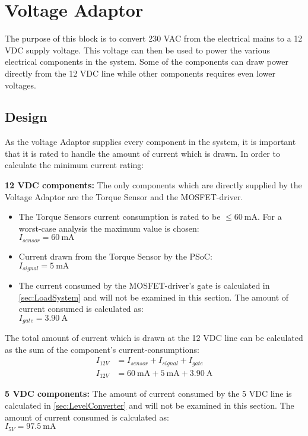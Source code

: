 \section{Voltage Adaptor}
The purpose of this block is to convert 230 VAC from the electrical mains to a 12 VDC supply voltage. This voltage can then be used to power the various electrical components in the system. Some of the components can draw power directly from the 12 VDC line while other components requires even lower voltages.

\subsection{Design}
As the voltage Adaptor supplies every component in the system, it is important that it is rated to handle the amount of current which is drawn.
In order to calculate the minimum current rating:

\textbf{12 VDC components:} The only components which are directly supplied by the Voltage Adaptor are the Torque Sensor and the MOSFET-driver.

\begin{itemize}
	\item The Torque Sensors current consumption is rated to be $\leq  \SI{60}{\milli\ampere}$. For a worst-case analysis the maximum value is chosen:\\
	$I_{sensor} = \SI{60}{\milli\ampere}$
	\item Current drawn from the Torque Sensor by the PSoC:\\
	$I_{signal} = \SI{5}{\milli\ampere}$
	\item The current consumed by the MOSFET-driver's gate is calculated in \ref{sec:LoadSystem} and will not be examined in this section. The amount of current consumed is calculated as:\\
	$I_{gate} = \SI{3.90}{\ampere}$
\end{itemize}

The total amount of current which is drawn at the 12 VDC line can be calculated as the sum of the component's current-consumptions:
\begin{equation}
	\begin{split}
		I_{12V} &= I_{sensor} + I_{signal} + I_{gate}\\
		I_{12V} &= \SI{60}{\milli\ampere} + \SI{5}{\milli\ampere} + \SI{3.90}{\ampere}
	\end{split}
\end{equation}

\textbf{5 VDC components:} The amount of current consumed by the 5 VDC line is calculated in \vref{sec:LevelConverter} and will not be examined in this section. The amount of current consumed is calculated as:\\
$I_{5V} = \SI{97.5}{\milli\ampere}$

